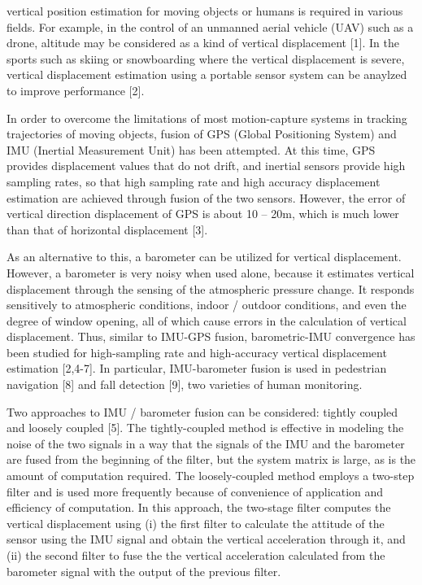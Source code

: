 \documentclass[10pt,journal,compsoc]{IEEEtran}
\begin{document}
\maketitle


\IEEEdisplaynontitleabstractindextext
\IEEEpeerreviewmaketitle


 vertical position estimation for moving objects or
humans is required in various fields. For example, in the control of an
unmanned aerial vehicle (UAV) such as a drone, altitude may be considered as a
kind of vertical displacement [1].  In the sports such as skiing or
snowboarding where the vertical displacement is severe, vertical displacement
estimation using a portable sensor system can be anaylzed to improve
performance [2].

In order to overcome the limitations of most motion-capture systems in
tracking trajectories of moving objects, fusion of GPS (Global Positioning
System) and IMU (Inertial Measurement Unit) has been attempted.  At this time,
GPS provides displacement values that do not drift, and inertial sensors
provide high sampling rates, so that high sampling rate and high accuracy
displacement estimation are achieved through fusion of the two sensors.
However, the error of vertical direction displacement of GPS is about 10 --
20m, which is much lower than that of horizontal displacement [3]. 

As an alternative to this, a barometer can be utilized for vertical
displacement. However, a barometer is very noisy when used alone, because
it estimates vertical displacement through the sensing of the
atmospheric pressure change. It responds sensitively to atmospheric conditions,
indoor / outdoor conditions, and even the degree of window opening, all of
which cause errors in the calculation of vertical displacement. Thus, similar
to IMU-GPS fusion, barometric-IMU convergence has been studied for
high-sampling rate and high-accuracy vertical displacement estimation [2,4-7].
In particular, IMU-barometer fusion is used in pedestrian navigation [8]
and fall detection [9], two varieties of human monitoring.

Two approaches to IMU / barometer fusion can be considered: tightly
coupled and loosely coupled [5]. The tightly-coupled method is effective in
modeling the noise of the two signals in a way that the signals of the IMU and
the barometer are fused from the beginning of the filter, but the system matrix
is large, as is the amount of computation required.  The loosely-coupled method
employs a two-step filter and is used more frequently because of convenience
of application and efficiency of computation. In this approach, the two-stage
filter computes the vertical displacement using (i) the first filter to
calculate the attitude of the sensor using the IMU signal and obtain the
vertical acceleration through it, and (ii) the second filter to fuse the the
vertical acceleration calculated from the barometer signal with the output of
the previous filter.
\end{document}
